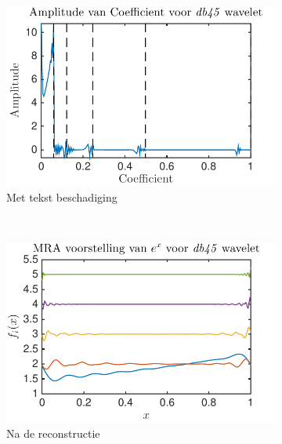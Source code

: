 \begin{figure}
\begin{subfigure}[b]{0.45\textwidth}
        \includegraphics[width=\textwidth]{../src/denoising/db45_noNoise/coef_exp_db45_4}
        \caption{Met tekst beschadiging}
        \label{fig:tiger}
    \end{subfigure}
    ~ %
    \begin{subfigure}[b]{0.45\textwidth}
        \includegraphics[width=\textwidth]{../src/denoising/db45_noNoise/MRA_exp_db45_4}
        \caption{Na de reconstructie}
        \label{fig:mouse}
    \end{subfigure}
    \begin{subfigure}[b]{0.45\textwidth}

\end{subfigure}
\end{figure}
